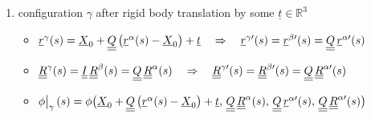\begin{frame}
\begin{enumerate}
    \item configuration $\gamma$ after rigid body translation by some $\underline{t} \in \mathbb{R}^3$
      \begin{itemize}
        \item $\underline{r}^{\gamma}(s) = \underline{X}_0 + \underline{\underline{Q}} \left( \underline{r}^{\alpha}(s) - \underline{X}_0 \right) + \underline{t} \quad \Rightarrow \quad \underline{r}^{\gamma \prime}(s) = \underline{r}^{\beta \prime}(s) = \underline{\underline{Q}} \,\underline{r}^{\alpha \prime}(s)$
        \item $\underline{\underline{R}}^{\gamma}(s) = \underline{\underline{I}} \, \underline{\underline{R}}^{\beta}(s) = \underline{\underline{Q}} \, \underline{\underline{R}}^{\alpha}(s) \quad \Rightarrow \quad \underline{\underline{R}}^{\gamma \prime}(s) = \underline{\underline{R}}^{\beta \prime}(s) = \underline{\underline{Q}} \, \underline{\underline{R}}^{\alpha \prime}(s)$
        \item $\eval[1]{\phi}_{\gamma}(s) = \phi \bigl( \underline{X}_0 + \doubleunderline{Q} \left( \underline{r}^{\alpha}(s) - \underline{X}_0 \right) + \underline{t} , \, \doubleunderline{Q} \, \doubleunderline{R}^{\alpha}(s) , \, \doubleunderline{Q} \,\underline{r}^{\alpha \prime}(s) , \, \doubleunderline{Q} \, \doubleunderline{R}^{\alpha \prime}(s) \bigr)$
      \end{itemize}
  \end{enumerate}
\end{frame}



